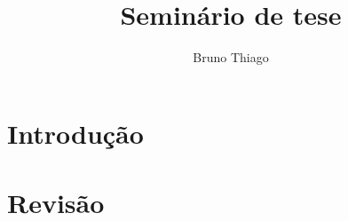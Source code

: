 \documentclass{article}
\author{Bruno Thiago}
\title{Seminário de tese}
\begin{document}
\maketitle

\begin{abstract}
	\lipsum[1]
\end{abstract}

\section{Introdução}
\lipsum[1-2]

\section{Revisão}
\lipsum[3-4]
\end{document}
